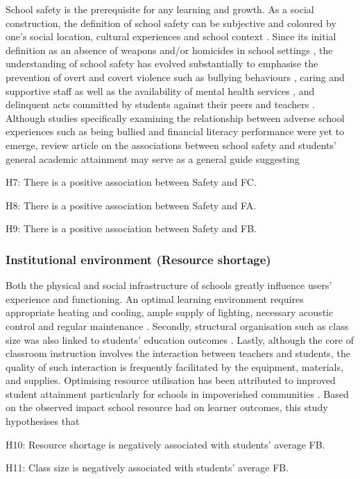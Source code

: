 School safety is the prerequisite for any learning and growth. As a social construction, the definition of school safety can be subjective and coloured by one's social location, cultural experiences and school context \parencite{cornell:2010}. Since its initial definition as an absence of weapons and/or  homicides in school settings \parencite{skiba:2006}, the understanding of school safety has evolved substantially to emphasise the prevention of overt and covert violence such as bullying behaviours \parencite[physical safety,][]{jimerson:2012}, caring and supportive staff as well as the availability of mental health services \parencite[emotional safety,][]{kuperminc:1997}, and delinquent acts committed by students against their peers and teachers \parencite[school order and discipline,][]{gottfredson:2005}. Although studies specifically examining the relationship between adverse school experiences such as being bullied and financial literacy performance were yet to emerge,  review article on the associations between school safety and students' general academic attainment may serve as a general guide suggesting
\begin{MAEitemize}
    \item[H7:] There is a positive association between Safety and FC.
    \item[H8:] There is a positive association between Safety and FA.
    \item[H9:] There is a positive association between Safety and FB.
\end{MAEitemize}

\subsubsection{Institutional environment (Resource shortage)}

Both the physical and social infrastructure of schools greatly influence users' experience and functioning. An optimal learning environment requires appropriate heating and cooling, ample supply of lighting, necessary acoustic control and regular maintenance \parencite[environmental adequacy,][]{uline:2008}. Secondly, structural organisation such as class size was also linked to students' education outcomes \parencite{finn:1999}. Lastly, although the core of classroom instruction involves the interaction between teachers and students, the quality of such interaction is frequently facilitated by the equipment, materials, and supplies. Optimising resource utilisation has been attributed to improved student attainment particularly for schools in impoverished communities \parencite{miles:1998}. Based on the observed impact school resource had on learner outcomes, this study hypothesises that
\begin{MAEitemize}
    \item[H10:] Resource shortage is negatively associated with students' average FB.
    \item[H11:] Class size is negatively associated with students' average FB.
\end{MAEitemize}

